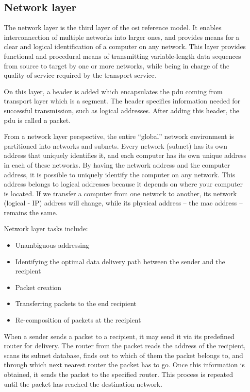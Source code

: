\subsection{Network layer}
The network layer is the third layer of the \acrshort{osi} reference model. It enables interconnection of multiple networks into larger ones, and provides means for a clear and logical identification of a computer on any network. This layer provides functional and procedural means of transmitting variable-length data sequences from source to target by one or more networks, while being in charge of the quality of service required by the transport service. 

On this layer, a header is added which encapsulates the \acrfull{pdu} coming from transport layer which is a segment. The header specifies information needed for successful transmission, such as logical addresses. After adding this header, the \acrshort{pdu} is called a packet.

From a network layer perspective, the entire ``global'' network environment is partitioned into networks and subnets. Every network (subnet) has its own address that uniquely identifies it, and each computer has its own unique address in each of these networks. By having the network address and the computer address, it is possible to uniquely identify the computer on any network. This address belongs to logical addresses because it depends on where your computer is located. If we transfer a computer from one network to another, its network (logical - IP) address will change, while its physical address -- the \acrshort{mac} address -- remains the same.

Network layer tasks include:
\begin{itemize}[noitemsep]
    \item Unambiguous addressing
    \item Identifying the optimal data delivery path between the sender and the recipient
    \item Packet creation
    \item Transferring packets to the end recipient
    \item Re-composition of packets at the recipient
\end{itemize}

When a sender sends a packet to a recipient, it may send it via its predefined router for delivery. The router from the packet reads the address of the recipient, scans its subnet database, finds out to which of them the packet belongs to, and through which next nearest router the packet has to go. Once this information is obtained, it sends the packet to the specified router. This process is repeated until the packet has reached the destination network.

